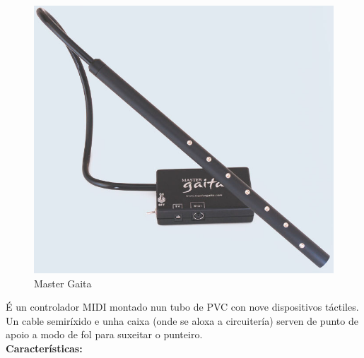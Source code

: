   \begin{figure}[htbp]
   \centering
   \includegraphics[scale=0.2,keepaspectratio=true]{./imagenes/master-gaita.jpg}
   \caption[Master Gaita]{Master Gaita \cite{MasterGaita}}
   \label{figura:MasterGaita}
  \end{figure}

  É un controlador MIDI montado nun tubo de PVC con nove dispositivos táctiles.
  Un cable semiríxido e unha caixa (onde se aloxa a circuitería) serven de
  punto de apoio a modo de fol para suxeitar o punteiro. \\

  \textbf{Características:}

